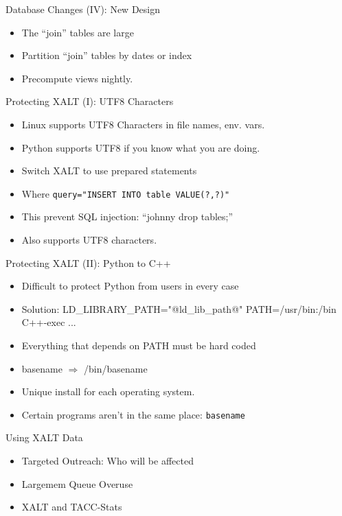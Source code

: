 \documentclass{beamer}
\begin{document}
\begin{frame}{Database Changes (IV): New Design}
  \begin{itemize}
    \item The ``join'' tables are large 
    \item Partition ``join'' tables by dates or index
    \item Precompute views nightly.
  \end{itemize}
\end{frame}

\begin{frame}{Protecting XALT (I): UTF8 Characters}
  \begin{itemize}
    \item Linux supports UTF8 Characters in file names, env. vars.
    \item Python supports UTF8 if you know what you are doing.
    \item Switch XALT to use prepared statements
    \item Where \texttt{query="INSERT INTO table VALUE(?,?)"}
    \item This prevent SQL injection: ``johnny drop tables;''
    \item Also supports UTF8 characters.
  \end{itemize}
\end{frame}

\begin{frame}{Protecting XALT (II): Python to C++}
    \begin{itemize}
      \item Difficult to protect Python from users in every case
      \item Solution: LD\_LIBRARY\_PATH="@ld\_lib\_path@"
        PATH=/usr/bin:/bin C++-exec ...
      \item Everything that depends on PATH must be hard coded
      \item basename $\Rightarrow$ /bin/basename
      \item Unique install for each operating system.
      \item Certain programs aren't in the same place: \texttt{basename}
    \end{itemize}
\end{frame}

\begin{frame}{Using XALT Data}
  \begin{itemize}
    \item Targeted Outreach: Who will be affected
    \item Largemem Queue Overuse
    \item XALT and TACC-Stats
  \end{itemize}
\end{frame}
\end{document}
